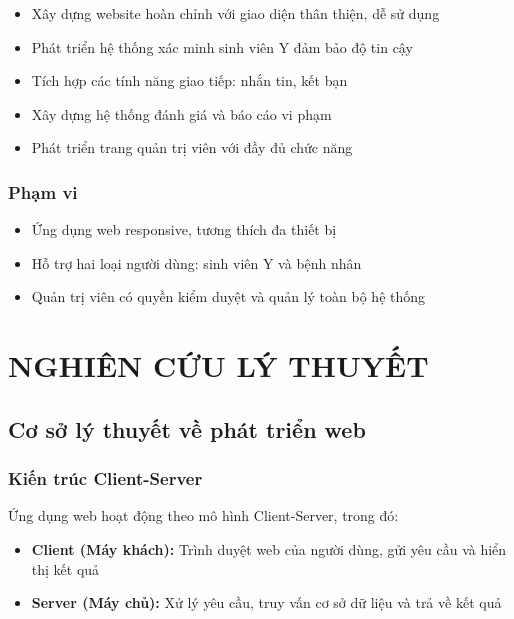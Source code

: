 \documentclass[12pt,a4paper]{report}
\begin{document}
\begin{itemize}
    \item Xây dựng website hoàn chỉnh với giao diện thân thiện, dễ sử dụng
    \item Phát triển hệ thống xác minh sinh viên Y đảm bảo độ tin cậy
    \item Tích hợp các tính năng giao tiếp: nhắn tin, kết bạn
    \item Xây dựng hệ thống đánh giá và báo cáo vi phạm
    \item Phát triển trang quản trị viên với đầy đủ chức năng
\end{itemize}

\subsection{Phạm vi}

\begin{itemize}
    \item Ứng dụng web responsive, tương thích đa thiết bị
    \item Hỗ trợ hai loại người dùng: sinh viên Y và bệnh nhân
    \item Quản trị viên có quyền kiểm duyệt và quản lý toàn bộ hệ thống
\end{itemize}

\newpage

\chapter{NGHIÊN CỨU LÝ THUYẾT}

\section{Cơ sở lý thuyết về phát triển web}

\subsection{Kiến trúc Client-Server}

Ứng dụng web hoạt động theo mô hình Client-Server, trong đó:

\begin{itemize}
    \item \textbf{Client (Máy khách):} Trình duyệt web của người dùng, gửi yêu cầu và hiển thị kết quả
    \item \textbf{Server (Máy chủ):} Xử lý yêu cầu, truy vấn cơ sở dữ liệu và trả về kết quả
\end{itemize}
\end{document}
